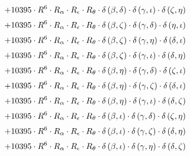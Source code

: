 \begin{subequations}
\begin{gather}
 \\[0.2em] \notag 		 + 10395 \cdot R^{6} \cdot R_{\alpha{}} \cdot R_{\epsilon{}} \cdot R_{\theta{}} \cdot \delta{}\left(\beta{}, \delta{}\right) \cdot \delta{}\left(\gamma{}, \iota{}\right) \cdot \delta{}\left(\zeta{}, \eta{}\right) 
 \\[0.2em] \notag 		 + 10395 \cdot R^{6} \cdot R_{\alpha{}} \cdot R_{\epsilon{}} \cdot R_{\theta{}} \cdot \delta{}\left(\beta{}, \zeta{}\right) \cdot \delta{}\left(\gamma{}, \delta{}\right) \cdot \delta{}\left(\eta{}, \iota{}\right) 
 \\[0.2em] \notag 		 + 10395 \cdot R^{6} \cdot R_{\alpha{}} \cdot R_{\epsilon{}} \cdot R_{\theta{}} \cdot \delta{}\left(\beta{}, \zeta{}\right) \cdot \delta{}\left(\gamma{}, \eta{}\right) \cdot \delta{}\left(\delta{}, \iota{}\right) 
 \\[0.2em] \notag 		 + 10395 \cdot R^{6} \cdot R_{\alpha{}} \cdot R_{\epsilon{}} \cdot R_{\theta{}} \cdot \delta{}\left(\beta{}, \zeta{}\right) \cdot \delta{}\left(\gamma{}, \iota{}\right) \cdot \delta{}\left(\delta{}, \eta{}\right) 
 \\[0.2em] \notag 		 + 10395 \cdot R^{6} \cdot R_{\alpha{}} \cdot R_{\epsilon{}} \cdot R_{\theta{}} \cdot \delta{}\left(\beta{}, \eta{}\right) \cdot \delta{}\left(\gamma{}, \delta{}\right) \cdot \delta{}\left(\zeta{}, \iota{}\right) 
 \\[0.2em] \notag 		 + 10395 \cdot R^{6} \cdot R_{\alpha{}} \cdot R_{\epsilon{}} \cdot R_{\theta{}} \cdot \delta{}\left(\beta{}, \eta{}\right) \cdot \delta{}\left(\gamma{}, \zeta{}\right) \cdot \delta{}\left(\delta{}, \iota{}\right) 
 \\[0.2em] \notag 		 + 10395 \cdot R^{6} \cdot R_{\alpha{}} \cdot R_{\epsilon{}} \cdot R_{\theta{}} \cdot \delta{}\left(\beta{}, \eta{}\right) \cdot \delta{}\left(\gamma{}, \iota{}\right) \cdot \delta{}\left(\delta{}, \zeta{}\right) 
 \\[0.2em] \notag 		 + 10395 \cdot R^{6} \cdot R_{\alpha{}} \cdot R_{\epsilon{}} \cdot R_{\theta{}} \cdot \delta{}\left(\beta{}, \iota{}\right) \cdot \delta{}\left(\gamma{}, \delta{}\right) \cdot \delta{}\left(\zeta{}, \eta{}\right) 
 \\[0.2em] \notag 		 + 10395 \cdot R^{6} \cdot R_{\alpha{}} \cdot R_{\epsilon{}} \cdot R_{\theta{}} \cdot \delta{}\left(\beta{}, \iota{}\right) \cdot \delta{}\left(\gamma{}, \zeta{}\right) \cdot \delta{}\left(\delta{}, \eta{}\right) 
 \\[0.2em] \notag 		 + 10395 \cdot R^{6} \cdot R_{\alpha{}} \cdot R_{\epsilon{}} \cdot R_{\theta{}} \cdot \delta{}\left(\beta{}, \iota{}\right) \cdot \delta{}\left(\gamma{}, \eta{}\right) \cdot \delta{}\left(\delta{}, \zeta{}\right) 

\end{gather}
\end{subequations}
